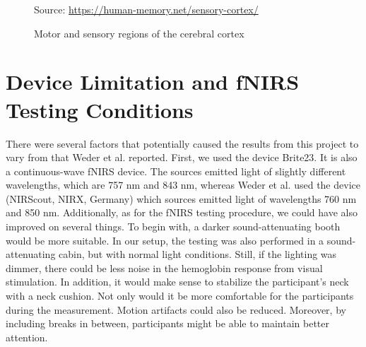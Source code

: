 \begin{figure}[H]
  \centering
           {Source: \url{https://human-memory.net/sensory-cortex/}}
  \caption{Motor and sensory regions of the cerebral cortex}
  \label{fig:CerebralCortex}
\end{figure}

\section{Device Limitation and fNIRS Testing Conditions}

There were several factors that potentially caused the results from this project to vary from that Weder et al. \citeyearpar{Weder2018} reported. First, we used the device Brite23. It is also a continuous-wave fNIRS device. The sources emitted light of slightly different wavelengths, which are 757 nm and 843 nm, whereas Weder et al. \citeyearpar{Weder2018} used the device (NIRScout, NIRX, Germany) which sources emitted light of wavelengths 760 nm and 850 nm. Additionally, as for the fNIRS testing procedure, we could have also improved on several things. To begin with, a darker sound-attenuating booth would be more suitable. In our setup, the testing was also performed in a sound-attenuating cabin, but with normal light conditions. Still, if the lighting was dimmer, there could be less noise in the hemoglobin response from visual stimulation. In addition, it would make sense to stabilize the participant's neck with a neck cushion. Not only would it be more comfortable for the participants during the measurement. Motion artifacts could also be reduced. Moreover, by including breaks in between, participants might be able to maintain better attention.

